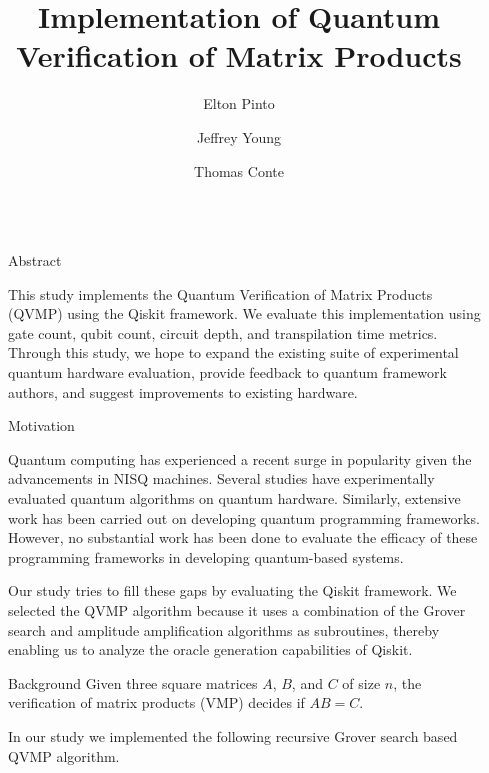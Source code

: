 \documentclass[final]{beamer}
\title{Implementation of Quantum Verification of Matrix Products}
\author{Elton Pinto \inst{1} \and Jeffrey Young \inst{1} \and Thomas Conte \inst{1}}
\institute[shortinst]{\inst{1} Georgia Institute of Technology}
\newlength{\sepwidth}
\newlength{\colwidth}
\newcommand{\separatorcolumn}{\begin{column}{\sepwidth}\end{column}}
\begin{document}
\begin{frame}[t]
\begin{columns}[t]
\separatorcolumn

\begin{column}{\colwidth}

  \begin{block}{Abstract}
 
  This study implements the Quantum Verification of Matrix Products (QVMP)
  \cite{ambainis_quantum_2002} using the Qiskit framework. We evaluate
  this implementation using gate count, qubit count, circuit depth, and
  transpilation time metrics. Through this study, we hope to expand the
  existing suite of experimental quantum hardware evaluation, provide
  feedback to quantum framework authors, and suggest improvements to
  existing hardware. 

  \end{block}

  \begin{block}{Motivation}

  Quantum computing has experienced a recent surge in popularity given the
  advancements in NISQ machines. Several studies have experimentally
  evaluated quantum algorithms on quantum hardware. Similarly, extensive
  work has been carried out on developing quantum programming frameworks.
  However, no substantial work has been done to evaluate the efficacy of
  these programming frameworks in developing quantum-based systems.

  Our study tries to fill these gaps by evaluating the Qiskit framework. We
  selected the QVMP algorithm because it uses a combination of the Grover
  search and amplitude amplification algorithms as subroutines, thereby
  enabling us to analyze the oracle generation capabilities of Qiskit.

  \end{block}

  \begin{block}{Background}
    Given three square matrices $A$, $B$, and $C$ of size $n$, the verification
    of matrix products (VMP) decides if $AB = C$.

    In our study we implemented the following recursive Grover search based QVMP
    algorithm.


\end{block}
\end{column}
\end{columns}
\end{frame}
\end{document}
